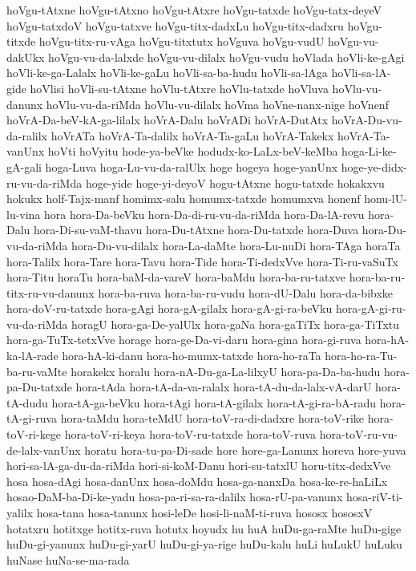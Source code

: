 {hoVgu-tAtxne
hoVgu-tAtxno
hoVgu-tAtxre
hoVgu-tatxde
hoVgu-tatx-deyeV
hoVgu-tatxdoV
hoVgu-tatxve
hoVgu-titx-dadxLu
hoVgu-titx-dadxru
hoVgu-titxde
hoVgu-titx-ru-vAga
hoVgu-titxtutx
hoVguva
hoVgu-vudU
hoVgu-vu-dakUkx
hoVgu-vu-da-lalxde
hoVgu-vu-dilalx
hoVgu-vudu
hoVlada
hoVli-ke-gAgi
hoVli-ke-ga-Lalalx
hoVli-ke-gaLu
hoVli-sa-ba-hudu
hoVli-sa-lAga
hoVli-sa-lA-gide
hoVlisi
hoVli-su-tAtxne
hoVlu-tAtxre
hoVlu-tatxde
hoVluva
hoVlu-vu-danunx
hoVlu-vu-da-riMda
hoVlu-vu-dilalx
hoVma
hoVne-nanx-nige
hoVnenf
hoVrA-Da-beV-kA-ga-lilalx
hoVrA-Dalu
hoVrADi
hoVrA-DutAtx
hoVrA-Du-vu-da-ralilx
hoVrATa
hoVrA-Ta-dalilx
hoVrA-Ta-gaLu
hoVrA-Takekx
hoVrA-Ta-vanUnx
hoVti
hoVyitu
hode-ya-beVke
hodudx-ko-LaLx-beV-keMba
hoga-Li-ke-gA-gali
hoga-Luva
hoga-Lu-vu-da-ralUlx
hoge
hogeya
hoge-yanUnx
hoge-ye-didx-ru-vu-da-riMda
hoge-yide
hoge-yi-deyoV
hogu-tAtxne
hogu-tatxde
hokakxvu
hokukx
holf-Tajx-manf
homimx-salu
homumx-tatxde
homumxva
honenf
honu-lU-lu-vina
hora
hora-Da-beVku
hora-Da-di-ru-vu-da-riMda
hora-Da-lA-revu
hora-Dalu
hora-Di-su-vaM-thavu
hora-Du-tAtxne
hora-Du-tatxde
hora-Duva
hora-Du-vu-da-riMda
hora-Du-vu-dilalx
hora-La-daMte
hora-Lu-nuDi
hora-TAga
horaTa
hora-Talilx
hora-Tare
hora-Tavu
hora-Tide
hora-Ti-dedxVve
hora-Ti-ru-vaSuTx
hora-Titu
horaTu
hora-baM-da-vareV
hora-baMdu
hora-ba-ru-tatxve
hora-ba-ru-titx-ru-vu-danunx
hora-ba-ruva
hora-ba-ru-vudu
hora-dU-Dalu
hora-da-bibxke
hora-doV-ru-tatxde
hora-gAgi
hora-gA-gilalx
hora-gA-gi-ra-beVku
hora-gA-gi-ru-vu-da-riMda
horagU
hora-ga-De-yalUlx
hora-gaNa
hora-gaTiTx
hora-ga-TiTxtu
hora-ga-TuTx-tetxVve
horage
hora-ge-Da-vi-daru
hora-gina
hora-gi-ruva
hora-hA-ka-lA-rade
hora-hA-ki-danu
hora-ho-mumx-tatxde
hora-ho-raTa
hora-ho-ra-Tu-ba-ru-vaMte
horakekx
horalu
hora-nA-Du-ga-La-lilxyU
hora-pa-Da-ba-hudu
hora-pa-Du-tatxde
hora-tAda
hora-tA-da-va-ralalx
hora-tA-du-da-lalx-vA-darU
hora-tA-dudu
hora-tA-ga-beVku
hora-tAgi
hora-tA-gilalx
hora-tA-gi-ra-bA-radu
hora-tA-gi-ruva
hora-taMdu
hora-teMdU
hora-toV-ra-di-dadxre
hora-toV-rike
hora-toV-ri-kege
hora-toV-ri-keya
hora-toV-ru-tatxde
hora-toV-ruva
hora-toV-ru-vu-de-lalx-vanUnx
horatu
hora-tu-pa-Di-sade
hore
hore-ga-Lanunx
horeva
hore-yuva
hori-sa-lA-ga-du-da-riMda
hori-si-koM-Danu
hori-su-tatxlU
horu-titx-dedxVve
hosa
hosa-dAgi
hosa-danUnx
hosa-doMdu
hosa-ga-nanxDa
hosa-ke-re-haLiLx
hosao-DaM-ba-Di-ke-yadu
hosa-pa-ri-sa-ra-dalilx
hosa-rU-pa-vanunx
hosa-riV-ti-yalilx
hosa-tana
hosa-tanunx
hosi-leDe
hosi-li-naM-ti-ruva
hososx
hososxV
hotatxru
hotitxge
hotitx-ruva
hotutx
hoyudx
hu
huA
huDu-ga-raMte
huDu-gige
huDu-gi-yanunx
huDu-gi-yarU
huDu-gi-ya-rige
huDu-kalu
huLi
huLukU
huLuku
huNase
huNa-se-ma-rada
}
